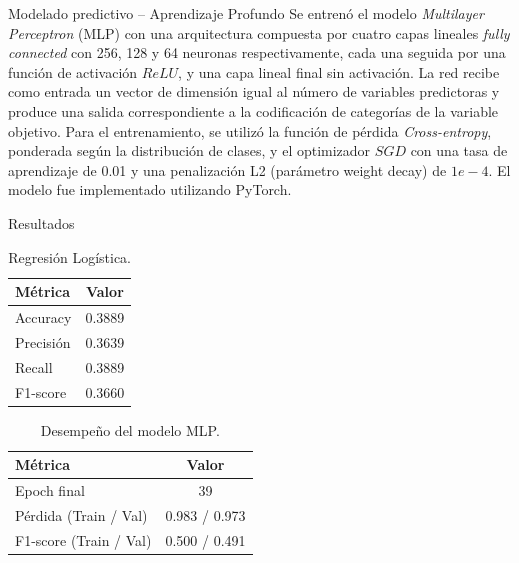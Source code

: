 \documentclass{beamer}
\begin{document}
    \begin{frame}{Modelado predictivo -- Aprendizaje Profundo}
        Se entrenó el modelo \textit{Multilayer  Perceptron} (MLP) con una arquitectura
        compuesta por cuatro capas lineales \textit{fully connected} con 256, 128 y 64 neuronas respectivamente, cada una seguida por una 
        función de activación $ReLU$, y una capa lineal final sin activación. 
        La red recibe como entrada un vector de dimensión igual al número de variables predictoras y 
        produce una salida correspondiente a la codificación de categorías de la variable objetivo.
        \linebreak
        Para el entrenamiento, se utilizó la función de pérdida \textit{Cross-entropy}, ponderada 
        según la distribución de clases, y el optimizador $SGD$ con una tasa de aprendizaje de 0.01
        y una penalización L2 (parámetro weight decay) de $1e-4$.
        \linebreak
        El modelo fue implementado utilizando PyTorch.
    \end{frame}
    \begin{frame}{Resultados}
        \begin{table}[h]
            \centering
            \caption{Regresión Logística.}
            \begin{tabular}{l c}
                \toprule
                \textbf{Métrica} & \textbf{Valor} \\
                \midrule
                Accuracy   & 0.3889 \\
                Precisión  & 0.3639 \\
                Recall     & 0.3889 \\
                F1-score   & 0.3660 \\
                \bottomrule
            \end{tabular}
            \label{tab:logistica}
        \end{table}
        \begin{table}[h]
            \centering
            \caption{Desempeño del modelo MLP.}
            \begin{tabular}{l c}
                \toprule
                \textbf{Métrica} & \textbf{Valor} \\
                \midrule
                Epoch final             & 39 \\
                Pérdida (Train / Val)   & 0.983 / 0.973 \\
                F1-score (Train / Val)  & 0.500 / 0.491 \\
                \bottomrule
            \end{tabular}
            \label{tab:mlp}
        \end{table}
    \end{frame}
\end{document}
